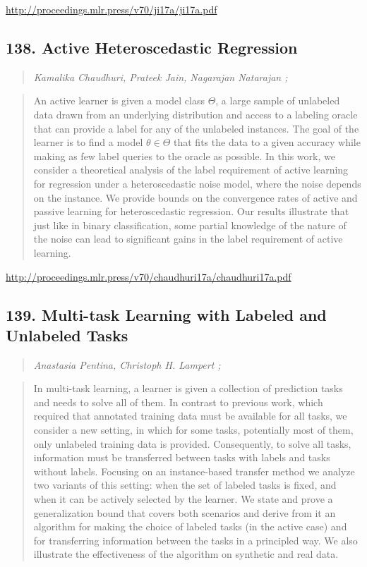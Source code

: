 \documentclass{article}
\begin{document}
\href{http://proceedings.mlr.press/v70/ji17a/ji17a.pdf}{http://proceedings.mlr.press/v70/ji17a/ji17a.pdf}

\subsection{138. Active Heteroscedastic Regression}

\begin{quote}
\footnotesize{\textit{Kamalika Chaudhuri, Prateek Jain, Nagarajan Natarajan ;}}
\end{quote}

\begin{quote}
    An active learner is given a model class $\Theta$, a large sample of unlabeled data drawn from an underlying distribution and access to a labeling oracle that can provide a label for any of the unlabeled instances. The goal of the learner is to find a model $\theta \in \Theta$ that fits the data to a given accuracy while making as few label queries to the oracle as possible. In this work, we consider a theoretical analysis of the label requirement of active learning for regression under a heteroscedastic noise model, where the noise depends on the instance. We provide bounds on the convergence rates of active and passive learning for heteroscedastic regression. Our results illustrate that just like in binary classification, some partial knowledge of the nature of the noise can lead to significant gains in the label requirement of active learning.  \end{quote}

\href{http://proceedings.mlr.press/v70/chaudhuri17a/chaudhuri17a.pdf}{http://proceedings.mlr.press/v70/chaudhuri17a/chaudhuri17a.pdf}

\subsection{139. Multi-task Learning with Labeled and Unlabeled Tasks}

\begin{quote}
\footnotesize{\textit{Anastasia Pentina, Christoph H. Lampert ;}}
\end{quote}

\begin{quote}
    In multi-task learning, a learner is given a collection of prediction tasks and needs to solve all of them. In contrast to previous work, which required that annotated training data must be available for all tasks, we consider a new setting, in which for some tasks, potentially most of them, only unlabeled training data is provided. Consequently, to solve all tasks, information must be transferred between tasks with labels and tasks without labels. Focusing on an instance-based transfer method we analyze two variants of this setting: when the set of labeled tasks is fixed, and when it can be actively selected by the learner. We state and prove a generalization bound that covers both scenarios and derive from it an algorithm for making the choice of labeled tasks (in the active case) and for transferring information between the tasks in a principled way. We also illustrate the effectiveness of the algorithm on synthetic and real data.  \end{quote}
\end{document}
